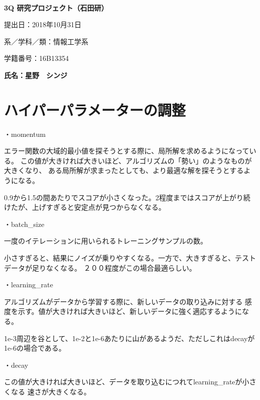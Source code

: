 \documentclass[a4j,11pt]{jarticle}
\begin{document}
\begin{center}
　\vspace{10mm}

{\bf {\huge 3Q 研究プロジェクト（石田研）}}

\vspace{80mm}

提出日：2018年10月31日

\vspace{10mm}

系／学科／類：情報工学系

\vspace{10mm}

学籍番号：16B13354

\vspace{20mm}

{\bf {\LARGE 氏名：星野　シンジ}}
\end{center}

\newpage

\section{ハイパーパラメーターの調整}

・momentum

エラー関数の大域的最小値を探そうとする際に、局所解を求めるようになっている。
この値が大きければ大きいほど、アルゴリズムの「勢い」のようなものが大きくなり、
ある局所解が求まったとしても、より最適な解を探そうとするようになる。

0.9から1.5の間あたりでスコアが小さくなった。2程度まではスコアが上がり続けたが、上げすぎると安定点が見つからなくなる。


・batch\_size

一度のイテレーションに用いられるトレーニングサンプルの数。

小さすぎると、結果にノイズが乗りやすくなる。一方で、大きすぎると、テストデータが足りなくなる。
２００程度がこの場合最適らしい。


・learning\_rate

アルゴリズムがデータから学習する際に、新しいデータの取り込みに対する
感度を示す。値が大きければ大きいほど、新しいデータに強く適応するようになる。

1e-3周辺を谷として、1e-2と1e-6あたりに山があるようだ、ただしこれはdecayが1e-6の場合である。


・decay

この値が大きければ大きいほど、データを取り込むにつれてlearning\_rateが小さくなる
速さが大きくなる。
\end{document}
